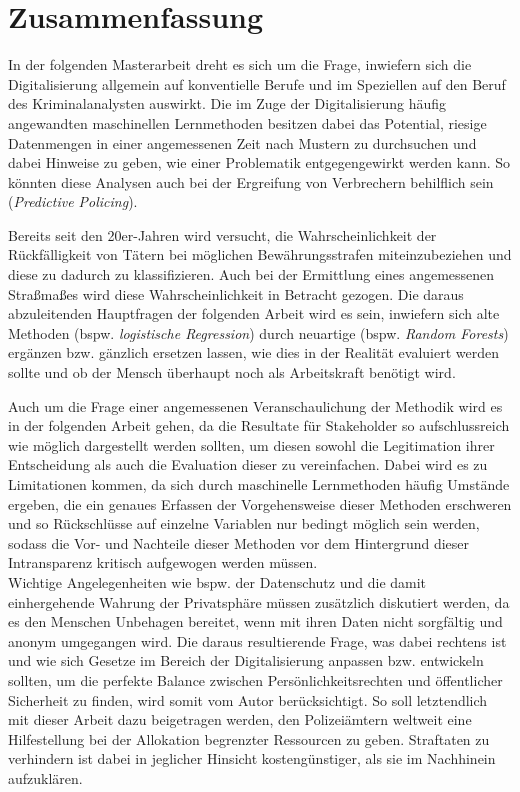 \documentclass[a4paper,12pt,parskip,bibtotoc,liststotoc]{article}
\begin{document}
\section{Zusammenfassung}

In der folgenden Masterarbeit dreht es sich um die Frage, inwiefern sich die Digitalisierung allgemein auf konventielle Berufe und im Speziellen auf den Beruf des Kriminalanalysten auswirkt. Die im Zuge der Digitalisierung häufig angewandten maschinellen Lernmethoden besitzen dabei das Potential, riesige Datenmengen in einer angemessenen Zeit nach Mustern zu durchsuchen und dabei Hinweise zu geben, wie einer Problematik entgegengewirkt werden kann. 
So könnten diese Analysen auch bei der Ergreifung von Verbrechern behilflich sein (\textit{Predictive Policing}).

Bereits seit den 20er-Jahren wird versucht, die Wahrscheinlichkeit der Rückfälligkeit von Tätern bei möglichen Bewährungsstrafen miteinzubeziehen und diese zu dadurch zu klassifizieren.
Auch bei der Ermittlung eines angemessenen Straßmaßes wird diese Wahrscheinlichkeit in Betracht gezogen.
Die daraus abzuleitenden Hauptfragen der folgenden Arbeit wird es sein, inwiefern sich alte Methoden (bspw. \textit{logistische Regression}) durch neuartige (bspw. \textit{Random Forests}) ergänzen bzw. gänzlich ersetzen lassen, wie dies in der Realität evaluiert werden sollte und ob der Mensch überhaupt noch als Arbeitskraft benötigt wird.

Auch um die Frage einer angemessenen Veranschaulichung der Methodik wird es in der folgenden Arbeit gehen, da die Resultate für Stakeholder so aufschlussreich wie möglich dargestellt werden sollten, um diesen sowohl die Legitimation ihrer Entscheidung als auch die Evaluation dieser zu vereinfachen.
Dabei wird es zu Limitationen kommen, da sich durch maschinelle Lernmethoden häufig Umstände ergeben, die ein genaues Erfassen der Vorgehensweise dieser Methoden erschweren und so Rückschlüsse auf einzelne Variablen nur bedingt möglich sein werden, sodass die Vor- und Nachteile dieser Methoden vor dem Hintergrund dieser Intransparenz kritisch aufgewogen werden müssen.\\

Wichtige Angelegenheiten wie bspw. der Datenschutz und die damit einhergehende Wahrung der Privatsphäre müssen zusätzlich diskutiert werden, da es den Menschen Unbehagen bereitet, wenn mit ihren Daten nicht sorgfältig und anonym umgegangen wird. 
Die daraus resultierende Frage, was dabei rechtens ist und wie sich Gesetze im Bereich der Digitalisierung anpassen bzw. entwickeln sollten, um die perfekte Balance zwischen Persönlichkeitsrechten und öffentlicher Sicherheit zu finden, wird somit vom Autor berücksichtigt.
So soll letztendlich mit dieser Arbeit dazu beigetragen werden, den Polizeiämtern weltweit eine Hilfestellung bei der Allokation begrenzter Ressourcen zu geben. 
Straftaten zu verhindern ist dabei in jeglicher Hinsicht kostengünstiger, als sie im Nachhinein aufzuklären.
\end{document}
